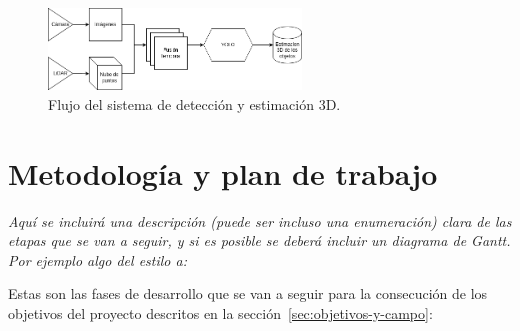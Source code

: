 \begin{figure}[hbtp]
	\centering
	\includegraphics[width=0.6\textwidth]{flujo.png}
	\caption{Flujo del sistema de detección y estimación 3D.}
	\label{fig:flujo_sistema}
\end{figure}



\section{Metodología y plan de trabajo}
\label{sec:metodologia-y-plan}

\textit{Aquí se incluirá una descripción (puede ser incluso una enumeración)
  clara de las etapas que se van a seguir, y si es posible se deberá
  incluir un diagrama de Gantt. Por ejemplo algo del estilo a:}

Estas son las fases de desarrollo que se van a seguir para la
consecución de los objetivos del proyecto descritos en la sección~\ref{sec:objetivos-y-campo}:


